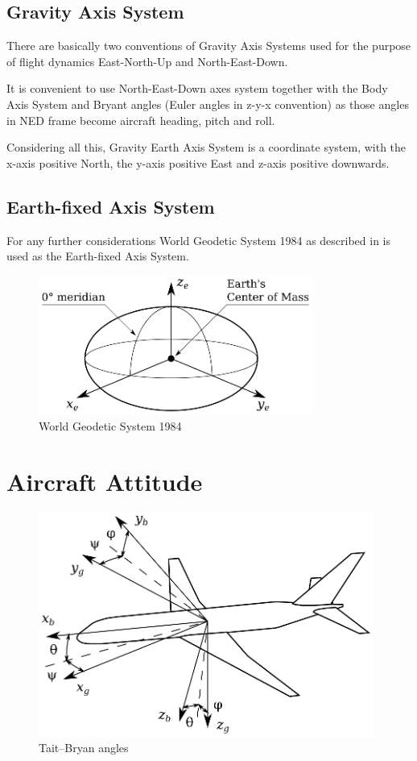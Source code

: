 \subsection{Gravity Axis System}

There are basically two conventions of Gravity Axis Systems used for the purpose of flight dynamics East\nobreakdash-North\nobreakdash-Up and North\nobreakdash-East\nobreakdash-Down.

It is convenient to use North-East-Down axes system together with the Body Axis System and Bryant angles (Euler angles in z\nobreakdash-y\nobreakdash-x convention) as those angles in NED frame become aircraft heading, pitch and roll.

Considering all this, Gravity Earth Axis System is a coordinate system, with the x\nobreakdash-axis positive North, the y\nobreakdash-axis positive East and z\nobreakdash-axis positive downwards.

\subsection{Earth-fixed Axis System}

For any further considerations World Geodetic System 1984 as described in \cite{NIMA-TR-8350-2} is used as the Earth-fixed Axis System.

\begin{figure}
  \centering
  \includegraphics[width=90mm]{images/coordinate_system_WGS.eps}
  \caption{World Geodetic System 1984}
\end{figure}

\section{Aircraft Attitude}

\begin{figure}[h!]
  \centering
  \includegraphics[width=110mm]{images/roll_pitch_yaw.eps}
  \caption{Tait–Bryan angles}
\end{figure}


